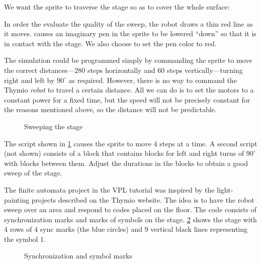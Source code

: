 

We want the  sprite to traverse the stage so as to cover the
whole surface:


In order the evaluate the quality of the sweep, the robot draws a thin
red line as it moves.  causes an imaginary pen in the
sprite to be lowered ``down'' so that it is in contact with the stage.
We also choose to set the pen color to red.

The simulation could be programmed simply by commanding the
sprite to move the correct distances---$280$ steps horizontally and
$60$ steps vertically---turning right and left by $90^{\circ}$ as
required. However, there is no way to command the Thymio \emph{robot} to
travel a certain distance. All we can do is to set the motors to a
constant power for a fixed time, but the speed will not be precisely
constant for the reasons mentioned above, so the distance will not be
predictable.

\begin{figure}
\caption{Sweeping the stage}\label{fig.sweep}
\end{figure}

The script shown in \cref{fig.sweep} causes the sprite to move 4 steps
at a time. A second script (not shown) consists of a
 block that contains blocks for left and right
turns of $90^{\circ}$ with  blocks between them. Adjust
the durations in the  blocks to obtain a good sweep of the
stage.



The finite automata project in the VPL tutorial was inspired by the
light-painting projects described on the Thymio website. The idea is to
have the robot sweep over an area and respond to codes placed on the
floor. The code consists of synchronization marks and marks of symbols
on the stage. \cref{fig.fa} shows the stage with 4 rows of 4 sync marks
(the blue circles) and 9 vertical black lines representing the symbol 1.

\begin{figure}[htb]
\caption{Synchronization and symbol marks}\label{fig.fa}
\end{figure}

\newpage

